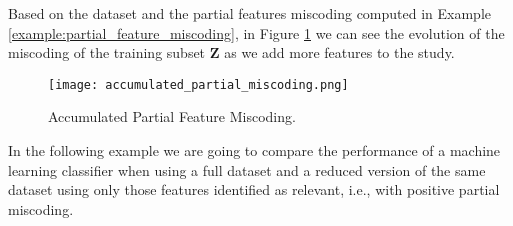 \begin{example}
\label{example:accumulated_partial_feature_miscoding}
Based on the dataset and the partial features miscoding computed in Example \ref{example:partial_feature_miscoding}, in Figure \ref{figure:accumulated_partial_feature_miscoding} we can see the evolution of the miscoding of the training subset $\mathbf{Z}$ as we add more features to the study.

\begin{figure}[h]
\centering
\texttt{[image: accumulated\_partial\_miscoding.png]}
\caption{Accumulated Partial Feature Miscoding.}
\label{figure:accumulated_partial_feature_miscoding}
\end{figure}

\end{example}

In the following example we are going to compare the performance of a machine learning classifier when using a full dataset and a reduced version of the same dataset using only those features identified as relevant, i.e., with positive partial miscoding.

